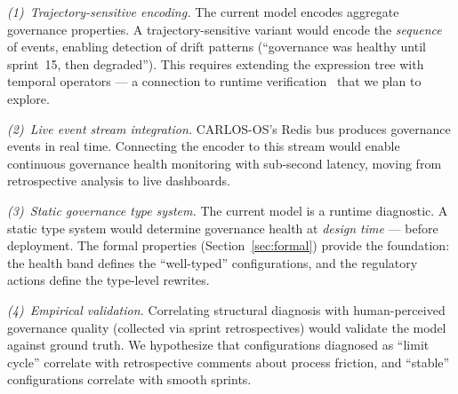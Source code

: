 \documentclass[sigconf,nonacm]{acmart}
\begin{document}
\emph{(1)~Trajectory-sensitive encoding.} The current model encodes
aggregate governance properties. A trajectory-sensitive variant would
encode the \emph{sequence} of events, enabling detection of drift
patterns (``governance was healthy until sprint~15, then degraded'').
This requires extending the expression tree with temporal operators ---
a connection to runtime verification~\cite{leucker} that we plan to
explore.

\emph{(2)~Live event stream integration.} CARLOS-OS's Redis bus
produces governance events in real time. Connecting the encoder to this
stream would enable continuous governance health monitoring with
sub-second latency, moving from retrospective analysis to live
dashboards.

\emph{(3)~Static governance type system.} The current model is a runtime
diagnostic. A static type system would determine governance health at
\emph{design time} --- before deployment. The formal properties
(Section~\ref{sec:formal}) provide the foundation: the health band
defines the ``well-typed'' configurations, and the regulatory actions
define the type-level rewrites.

\emph{(4)~Empirical validation.} Correlating structural diagnosis with
human-perceived governance quality (collected via sprint retrospectives)
would validate the model against ground truth. We hypothesize that
configurations diagnosed as ``limit cycle'' correlate with retrospective
comments about process friction, and ``stable'' configurations correlate
with smooth sprints.




\end{document}
